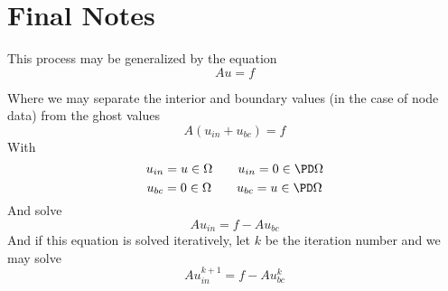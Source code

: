 \documentclass[11pt]{article}
\begin{document}
\section{Final Notes}
This process may be generalized by the equation
\begin{equation}
	Au = f
\end{equation}

Where we may separate the interior and boundary values (in the case of node data) from the ghost values
\begin{equation}
	A(u_{in} + u_{bc}) = f
\end{equation}
With
\begin{equation}
u_{in} = u \in \Omega \qquad u_{in} = 0 \in \PD \Omega
\end{equation}
\begin{equation}
u_{bc} = 0 \in \Omega \qquad u_{bc} = u \in \PD \Omega
\end{equation}
And solve
\begin{equation}
	Au_{in} = f - Au_{bc}
\end{equation}
And if this equation is solved iteratively, let $k$ be the iteration number and we may solve
\begin{equation}
	Au_{in}^{k+1} = f - Au_{bc}^k
\end{equation}
\end{document}
